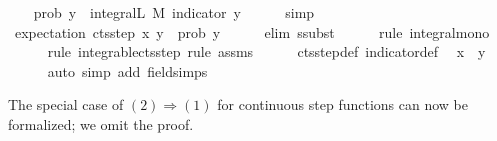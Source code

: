 \documentclass[leqno]{article}
\theoremstyle{definition}
\begin{document}
\begin{isabellebody}
\isanewline
{}\isamarkupfalse%
\isanewline
\ \ \isamarkupfalse%
\ {\isachardoublequoteopen}prob\ {\isacharbraceleft}{\isachardot}{\isachardot}y{\isacharbraceright}\ {\isacharequal}\ integral\isactrlsup L\ M\ {\isacharparenleft}indicator\ {\isacharbraceleft}{\isachardot}{\isachardot}y{\isacharbraceright}{\isacharparenright}{\isachardoublequoteclose}\isanewline
\ \ \ \ \isamarkupfalse%
\ simp\isanewline
\ \ \isamarkupfalse%
\ {\isachardoublequoteopen}expectation\ {\isacharparenleft}cts{\isacharunderscore}step\ x\ y{\isacharparenright}\ {\isasymle}\ prob\ {\isacharbraceleft}{\isachardot}{\isachardot}y{\isacharbraceright}{\isachardoublequoteclose}\isanewline
\ \ \ \ \isamarkupfalse%
\ {\isacharparenleft}elim\ ssubst{\isacharparenright}\isanewline
\ \ \ \ \isamarkupfalse%
\ {\isacharparenleft}rule\ integral{\isacharunderscore}mono{\isacharparenright}\isanewline
\ \ \ \ \isamarkupfalse%
\ {\isacharparenleft}rule\ integrable{\isacharunderscore}cts{\isacharunderscore}step{\isacharcomma}\ rule\ assms{\isacharparenright}\isanewline
\ \ \ \ \isamarkupfalse%
\ cts{\isacharunderscore}step{\isacharunderscore}def\ indicator{\isacharunderscore}def\ \isamarkupfalse%
\ {\isacharbackquoteopen}x\ {\isacharless}\ y{\isacharbackquoteclose}\isanewline
\ \ \ \ \isamarkupfalse%
\ {\isacharparenleft}auto\ simp\ add{\isacharcolon}\ field{\isacharunderscore}simps{\isacharparenright}\isanewline
{}
\end{isabellebody}

\medskip

The special case of $(2) \Longrightarrow (1)$ for continuous step functions can now be formalized; we omit the proof.

\medskip
\end{document}
